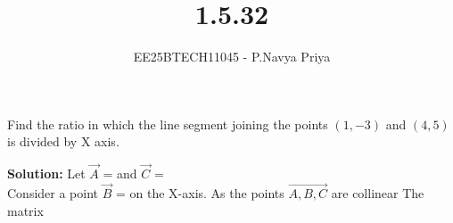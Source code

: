 \documentclass[journal,12pt,onecolumn]{IEEEtran}
\theoremstyle{remark}
\begin{document}
\title{1.5.32}
\author{EE25BTECH11045 - P.Navya Priya}
\maketitle
\renewcommand{\thefigure}{\theenumi}
\renewcommand{\thetable}{\theenumi}

\vspace{1cm}

 Find the ratio in which the line segment joining the points $(1,-3)$ and $(4,5)$ is divided
 by X axis.

\vspace{0.75cm}
\textbf{Solution:} Let $\vec{A}$ =  and $\vec{C}$ = \\[5pt]

Consider a point $\vec{B}$ =  on the X-axis.
As the points $\vec{A,B,C}$ are collinear
The matrix 
\end{document}
